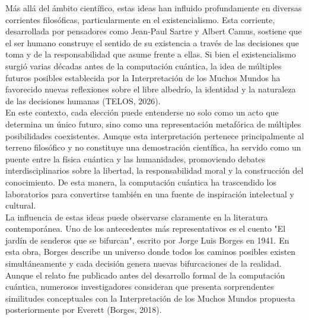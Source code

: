 \documentclass[12pt,a4paper]{article}
\begin{document}
Más allá del ámbito científico, estas ideas han influido profundamente en diversas corrientes filosóficas, particularmente en el existencialismo. Esta corriente, desarrollada por pensadores como Jean-Paul Sartre y Albert Camus, sostiene que el ser humano construye el sentido de su existencia a través de las decisiones que toma y de la responsabilidad que asume frente a ellas. Si bien el existencialismo surgió varias décadas antes de la computación cuántica, la idea de múltiples futuros posibles establecida por la Interpretación de los Muchos Mundos ha favorecido nuevas reflexiones sobre el libre albedrío, la identidad y la naturaleza de las decisiones humanas (TELOS, 2026).\\

En este contexto, cada elección puede entenderse no solo como un acto que determina un único futuro, sino como una representación metafórica de múltiples posibilidades coexistentes. Aunque esta interpretación pertenece principalmente al terreno filosófico y no constituye una demostración científica, ha servido como un puente entre la física cuántica y las humanidades, promoviendo debates interdisciplinarios sobre la libertad, la responsabilidad moral y la construcción del conocimiento. De esta manera, la computación cuántica ha trascendido los laboratorios para convertirse también en una fuente de inspiración intelectual y cultural.\\

La influencia de estas ideas puede observarse claramente en la literatura contemporánea. Uno de los antecedentes más representativos es el cuento "El jardín de senderos que se bifurcan", escrito por Jorge Luis Borges en 1941. En esta obra, Borges describe un universo donde todos los caminos posibles existen simultáneamente y cada decisión genera nuevas bifurcaciones de la realidad. Aunque el relato fue publicado antes del desarrollo formal de la computación cuántica, numerosos investigadores consideran que presenta sorprendentes similitudes conceptuales con la Interpretación de los Muchos Mundos propuesta posteriormente por Everett (Borges, 2018).\\
\end{document}
